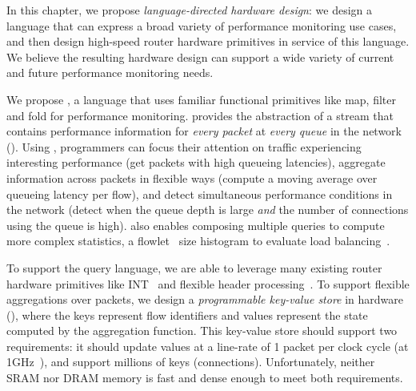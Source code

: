 In this chapter, we propose {\em language-directed hardware design}: we design a
language that can express a broad variety of performance monitoring use cases,
and then design high-speed router hardware primitives in service of this
language.
We believe the resulting hardware design can support a wide variety of current
and future performance monitoring needs.

 We propose {\em \TheSystem}, a language that
uses familiar functional primitives like {\ct map, filter} and {\ct fold} for
performance monitoring.  \TheSystem provides the abstraction of a stream that
contains performance information for {\em every packet} at {\em every queue} in
the network (). Using \TheSystem, programmers can focus their
attention on traffic experiencing interesting performance (\eg get packets with
high queueing latencies), aggregate information across packets in flexible ways
(\eg compute a moving average over queueing latency per flow), and detect
simultaneous performance conditions in the network (\eg detect when the queue
depth is large {\em and} the number of connections using the queue is high).
\TheSystem also enables composing multiple queries to compute more complex
statistics, \eg a flowlet~\cite{flowlets} size histogram to evaluate
load balancing~\cite{conga}.

 To support the \TheSystem query
language, we are able to leverage many existing router hardware primitives like
INT~\cite{int} and flexible header processing~\cite{rmt}. To support flexible
aggregations over packets, we design a {\em programmable key-value store} in
hardware (), where the keys represent flow identifiers and values
represent the state computed by the aggregation function. This key-value store
should support two requirements: it should update values at a line-rate of 1
packet per clock cycle (at 1GHz~\cite{rmt, xpliant_sdk}), and support millions
of keys (\ie connections). Unfortunately, neither SRAM nor DRAM memory is fast
and dense enough to meet both requirements.

